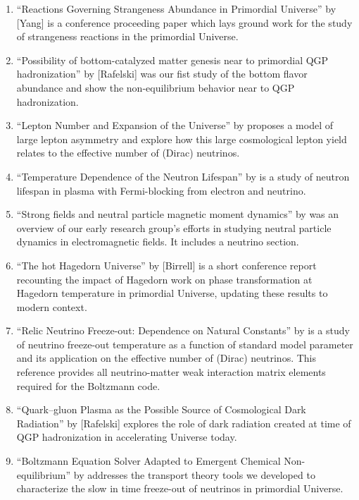 \begin{enumerate}
%
\item ``Reactions Governing Strangeness Abundance in Primordial Universe'' by [Yang] is a conference proceeding paper which lays ground work for the study of strangeness reactions in the primordial Universe. 
%
\item ``Possibility of bottom-catalyzed matter genesis near to primordial QGP hadronization'' by [Rafelski] was our fist study of the bottom flavor abundance and show the non-equilibrium behavior near to QGP hadronization. 
%
\item ``Lepton Number and Expansion of the Universe'' by  proposes a model of large lepton asymmetry and explore how this large cosmological lepton yield relates to the effective number of (Dirac) neutrinos.
%
\item ``Temperature Dependence of the Neutron Lifespan'' by  is a study of neutron lifespan in plasma with Fermi-blocking from electron and neutrino. 
%
\item ``Strong fields and neutral particle magnetic moment dynamics'' by  was an overview of our early research group's efforts in studying neutral particle dynamics in electromagnetic fields. It includes a neutrino section. 
%
\item ``The hot Hagedorn Universe'' by [Birrell] is a short conference report recounting the impact of Hagedorn work on phase transformation at Hagedorn temperature in primordial Universe, updating these results to modern context.
%
\item ``Relic Neutrino Freeze-out: Dependence on Natural Constants'' by  is a study of neutrino freeze-out temperature as a function of standard model parameter and its application on the effective number of (Dirac) neutrinos. This reference provides all neutrino-matter weak interaction matrix elements required for the Boltzmann code. 
%
\item ``Quark–gluon Plasma as the Possible Source of Cosmological Dark Radiation'' by [Rafelski] explores the role of dark radiation created at time of QGP hadronization in accelerating Universe today.
%
\item ``Boltzmann Equation Solver Adapted to Emergent Chemical Non-equilibrium'' by  addresses the transport theory tools we developed to characterize the slow in time freeze-out of neutrinos in primordial Universe.

\end{enumerate}

